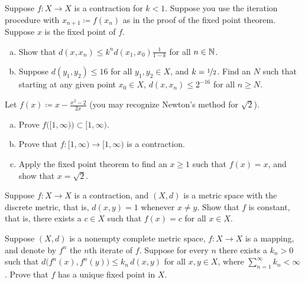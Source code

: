 \begin{exercise}
Suppose $f \colon X \to X$ is a contraction for $k < 1$.  Suppose you use the iteration
procedure with $x_{n+1} \coloneqq f(x_n)$ as in the proof of the fixed point theorem.
Suppose $x$ is the fixed
point of $f$.
\begin{enumerate}[a)]
\item
Show that $d(x,x_n) \leq k^n d(x_1,x_0) \frac{1}{1-k}$ for all $n \in {\mathbb{N}}$.
\item
Suppose $d(y_1,y_2) \leq 16$ for all $y_1,y_2 \in X$, and $k=
\nicefrac{1}{2}$.  Find an $N$ such that starting at any given point $x_0 \in X$, 
$d(x,x_n) \leq 2^{-16}$ for all $n \geq N$.
\end{enumerate}
\end{exercise}

\begin{exercise}
Let $f(x) \coloneqq x-\frac{x^2-2}{2x}$ (you may recognize Newton's method for
$\sqrt{2}$).
\begin{enumerate}[a)]
\item
Prove $f\bigl([1,\infty)\bigr) \subset [1,\infty)$.
\item
Prove that $f \colon [1,\infty) \to [1,\infty)$ is a contraction.
\item
Apply the fixed point theorem to find an $x \geq 1$ such that
$f(x) = x$, and show that $x = \sqrt{2}$.
\end{enumerate}
\end{exercise}

\begin{exercise}
Suppose $f \colon X \to X$ is a contraction, and $(X,d)$ is a metric space
with the discrete metric, that is, $d(x,y) = 1$ whenever $x \not= y$.
Show that $f$ is constant, that is,
there exists a $c \in X$ such that $f(x) = c$ for all $x \in X$.
\end{exercise}

\begin{exercise}
Suppose $(X,d)$ is a nonempty complete metric space,
$f \colon X \to X$ is a mapping, and denote
by $f^n$ the $n$th iterate of $f$.  Suppose
for every $n$ there exists a $k_n > 0$ such that
$d\bigl(f^n(x),f^n(y)\bigr) \leq k_n \, d(x,y)$
for all $x,y \in X$,
where $\sum_{n=1}^\infty k_n < \infty$.
Prove that $f$ has a unique fixed point in $X$.
\end{exercise}
